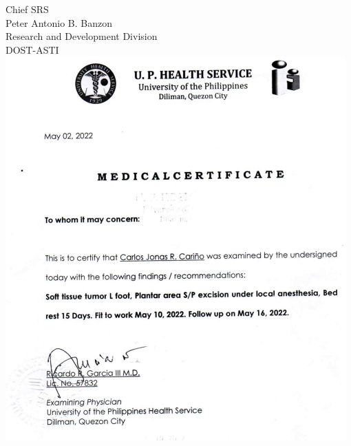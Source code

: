 \documentclass{letter}
\begin{document}
\begin{letter}{Chief SRS \\ Peter Antonio B. Banzon \\ Research and Development Division\\DOST-ASTI}
\newpage
\includegraphics{medcert.png}

\end{letter}
\end{document}
